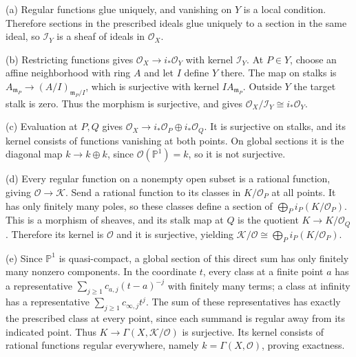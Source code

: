(a) Regular functions glue uniquely, and vanishing on $Y$ is a local condition. Therefore sections in the prescribed ideals glue uniquely to a section in the same ideal, so $\mathscr I_Y$ is a sheaf of ideals in $\mathcal O_X$.

(b) Restricting functions gives $\mathcal O_X\to i_*\mathcal O_Y$ with kernel $\mathscr I_Y$. At $P\in Y$, choose an affine neighborhood with ring $A$ and let $I$ define $Y$ there. The map on stalks is $A_{\mathfrak m_P}\to(A/I)_{\mathfrak m_P/I}$, which is surjective with kernel $IA_{\mathfrak m_P}$. Outside $Y$ the target stalk is zero. Thus the morphism is surjective, and  gives $\mathcal O_X/\mathscr I_Y\cong i_*\mathcal O_Y$.

(c) Evaluation at $P,Q$ gives $\mathcal O_X\to i_*\mathcal O_P\oplus i_*\mathcal O_Q$. It is surjective on stalks, and its kernel consists of functions vanishing at both points. On global sections it is the diagonal map $k\to k\oplus k$, since $\mathcal O(\mathbb{P}^1)=k$, so it is not surjective.

(d) Every regular function on a nonempty open subset is a rational function, giving $\mathcal O\to\mathscr K$. Send a rational function to its classes in $K/\mathcal O_P$ at all points. It has only finitely many poles, so these classes define a section of $\bigoplus_P i_P(K/\mathcal O_P)$. This is a morphism of sheaves, and its stalk map at $Q$ is the quotient $K\to K/\mathcal O_Q$. Therefore its kernel is $\mathcal O$ and it is surjective, yielding $\mathscr K/\mathcal O\cong\bigoplus_P i_P(K/\mathcal O_P)$.

(e) Since $\mathbb{P}^1$ is quasi-compact, a global section of this direct sum has only finitely many nonzero components. In the coordinate $t$, every class at a finite point $a$ has a representative $\sum_{j\geq1}c_{a,j}(t-a)^{-j}$ with finitely many terms; a class at infinity has a representative $\sum_{j\geq1}c_{\infty,j}t^j$. The sum of these representatives has exactly the prescribed class at every point, since each summand is regular away from its indicated point. Thus $K\to\Gamma(X,\mathscr K/\mathcal O)$ is surjective. Its kernel consists of rational functions regular everywhere, namely $k=\Gamma(X,\mathcal O)$, proving exactness.
